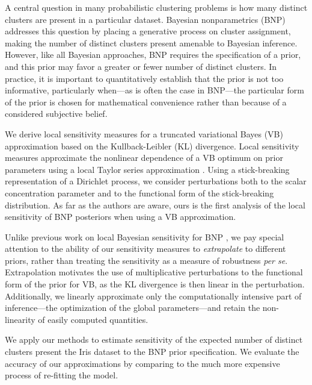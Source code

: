 
A central question in many probabilistic clustering problems is how many
distinct clusters are present in a particular dataset. Bayesian nonparametrics
(BNP) addresses this question by placing a generative process on cluster
assignment, making the number of distinct clusters present amenable to Bayesian
inference.  However, like all Bayesian approaches, BNP requires the
specification of a prior, and this prior may favor a greater or fewer number of
distinct clusters. In practice, it is important to quantitatively establish that
the prior is not too informative, particularly when---as is often the case in
BNP---the particular form of the prior is chosen for mathematical convenience
rather than because of a considered subjective belief.

We derive local sensitivity measures for a truncated variational Bayes (VB)
approximation based on the Kullback-Leibler (KL) divergence. Local sensitivity
measures approximate the nonlinear dependence of a VB optimum on prior
parameters using a local Taylor series approximation
\citep{gustafson:1996:localposterior, giordano:2017:covariances}. Using a
stick-breaking representation of a Dirichlet process, we consider perturbations
both to the scalar concentration parameter and to the functional form of the
stick-breaking distribution. As far as the authors are aware, ours is the first
analysis of the local sensitivity of BNP posteriors when using a VB
approximation.

Unlike previous work on local Bayesian sensitivity for BNP
\citep{Basu:2000:BNP_robustness}, we pay special attention to the ability of our
sensitivity measures to \emph{extrapolate} to different priors, rather than
treating the sensitivity as a measure of robustness \textit{per se}.
Extrapolation motivates the use of multiplicative perturbations to the
functional form of the prior for VB, as the KL divergence is then linear in the
perturbation. Additionally, we linearly approximate only the computationally
intensive part of inference---the optimization of the global parameters---and
retain the non-linearity of easily computed quantities.

We apply our methods to estimate sensitivity of the expected number of distinct
clusters present the Iris dataset \citep{iris_data_anderson, iris_data_fisher}
to the BNP prior specification.  We evaluate the accuracy of our approximations
by comparing to the much more expensive process of re-fitting the model.
